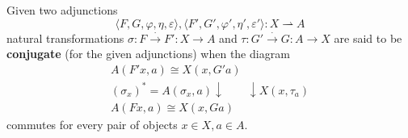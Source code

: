 Given two adjunctions
$$\langle F, G, \varphi, \eta, \varepsilon \rangle, \langle F', G', \varphi', \eta', \varepsilon' \rangle : X \rightharpoonup A$$
natural transformations $\sigma : F \xrightarrow{\cdot} F' : X \to A$ and $\tau : G' \xrightarrow{\cdot} G : A \to X$ are said to be \textbf{conjugate} (for the given adjunctions) when the diagram
$$\begin{array}{c}
A(F'x, a) \cong X(x, G'a) \\
(\sigma_x)^* = A(\sigma_x, a) \downarrow \quad \quad \downarrow X(x, \tau_a) \\
A(Fx, a) \cong X(x, Ga)
\end{array}$$
commutes for every pair of objects $x \in X, a \in A$.
